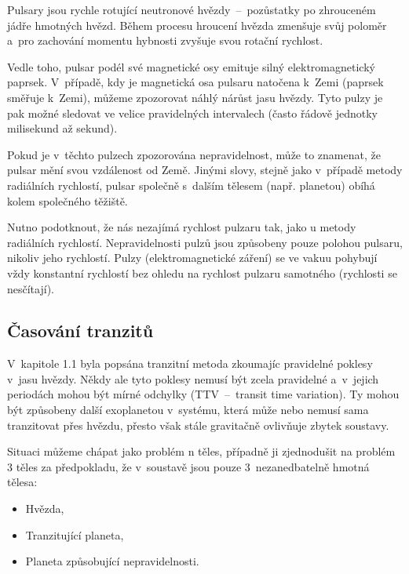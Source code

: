 \documentclass[a4paper,12pt]{article}
\begin{document}
{{{Pulsary jsou rychle rotující neutronové hvězdy~--~pozůstatky po zhrouceném jádře hmotných hvězd. Během procesu hroucení hvězda zmenšuje svůj poloměr a~pro zachování momentu hybnosti zvyšuje svou rotační rychlost.~\cite{methods}

Vedle toho, pulsar podél své magnetické osy emituje silný elektromagnetický paprsek. V~případě, kdy je magnetická osa pulsaru natočena k~Zemi (paprsek směřuje k~Zemi), můžeme zpozorovat náhlý nárůst jasu hvězdy. Tyto pulzy je pak možné sledovat ve velice pravidelných intervalech (často řádově jednotky milisekund až sekund).~\cite{methods}

Pokud je v~těchto pulzech zpozorována nepravidelnost, může to znamenat, že pulsar mění svou vzdálenost od Země. Jinými slovy, stejně jako v~případě metody radiálních rychlostí, pulsar společně s~dalším tělesem (např. planetou) obíhá kolem společného těžiště.~\cite{methods}

Nutno podotknout, že nás nezajímá rychlost pulzaru tak, jako u metody radiálních rychlostí. Nepravidelnosti pulzů jsou způsobeny pouze polohou pulsaru, nikoliv jeho rychlostí. Pulzy (elektromagnetické záření) se ve vakuu pohybují vždy konstantní rychlostí bez ohledu na rychlost pulzaru samotného (rychlosti se nesčítají).

\drawgimp

\clearpage
\subsection{Časování tranzitů}


V~kapitole 1.1 byla popsána tranzitní metoda zkoumajíc pravidelné poklesy v~jasu hvězdy. Někdy ale tyto poklesy nemusí být zcela pravidelné a~v~jejich periodách mohou být mírné odchylky (TTV~--~transit time variation). Ty mohou být způsobeny další exoplanetou v~systému, která může nebo nemusí sama tranzitovat přes hvězdu, přesto však stále gravitačně ovlivňuje zbytek soustavy.~\cite{ttv}

Situaci můžeme chápat jako problém n těles, případně ji zjednodušit na problém 3 těles za předpokladu, že v~soustavě jsou pouze 3~nezanedbatelně hmotná tělesa:

\begin{itemize}
\item Hvězda,
\item Tranzitující planeta,
\item Planeta způsobující nepravidelnosti.
\end{itemize}

}}}
\end{document}
